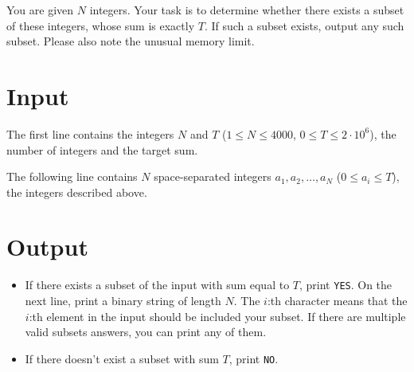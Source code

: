 You are given $N$ integers. Your task is to determine whether there exists a subset of these integers, whose
sum is exactly $T$. If such a subset exists, output any such subset. Please also note the unusual memory limit.

\section*{Input}
The first line contains the integers $N$ and $T$ ($1 \leq N \leq 4000$, $0 \leq T \leq 2 \cdot 10^6$), the number of
integers and the target sum.

The following line contains $N$ space-separated integers $a_1, a_2, \dots, a_N$ ($0 \leq a_i \leq T$), the integers
described above.

\section*{Output}
\begin{itemize}
    \item If there exists a subset of the input with sum equal to $T$, print \texttt{YES}. 
    On the next line, print a binary string of length $N$. The $i$:th character means that
    the $i$:th element in the input should be included your subset. If there are multiple valid subsets
    answers, you can print any of them.
    \item If there doesn't exist a subset with sum $T$, print \texttt{NO}.    
\end{itemize}
